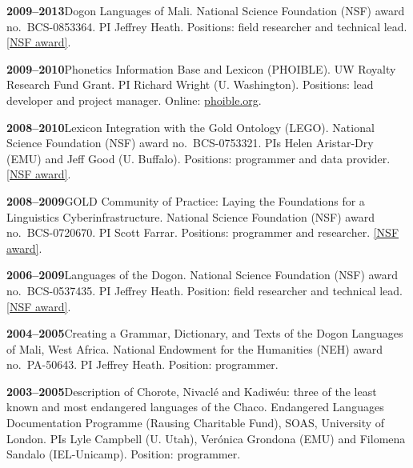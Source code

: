 \documentclass[11pt]{article}
\newcommand{\hangpara}{
 \setlength{\parindent}{0in} %
 \hangindent=0.42in %
}
\begin{document}
\vskip 6pt
\hangpara
{\bf 2009--2013}\hspace{1ex}Dogon Languages of Mali. National Science Foundation (NSF) award no.\ BCS-0853364. PI Jeffrey Heath. Positions: field researcher and technical lead. \href{https://www.nsf.gov/awardsearch/showAward?AWD_ID=0853364}{[NSF award]}.

\vskip 6pt
\hangpara
{\bf 2009--2010}\hspace{1ex}Phonetics Information Base and Lexicon (PHOIBLE). UW Royalty Research Fund Grant. PI Richard Wright (U. Washington). Positions: lead developer and project manager. Online: \href{https://phoible.org/}{phoible.org}.

\vskip 6pt
\hangpara
{\bf 2008--2010}\hspace{1ex}Lexicon Integration with the Gold Ontology (LEGO). National Science Foundation (NSF) award no.\ BCS-0753321. PIs Helen Aristar-Dry (EMU) and Jeff Good (U. Buffalo). Positions: programmer and data provider. \href{https://www.nsf.gov/awardsearch/showAward?AWD_ID=0753321}{[NSF award]}. 

\vskip 6pt
\hangpara
{\bf 2008--2009}\hspace{1ex}GOLD Community of Practice: Laying the Foundations for a Linguistics Cyberinfrastructure. National Science Foundation (NSF) award no.\ BCS-0720670. PI Scott Farrar. Positions: programmer and researcher. \href{https://www.nsf.gov/awardsearch/showAward?AWD_ID=0720670}{[NSF award]}. %

\vskip 6pt
\hangpara
{\bf 2006--2009}\hspace{1ex}Languages of the Dogon. National Science Foundation (NSF) award no.\ BCS-0537435. PI Jeffrey Heath. Position: field researcher and technical lead. \href{https://www.nsf.gov/awardsearch/showAward?AWD_ID=0537435}{[NSF award]}.

\vskip 6pt
\hangpara
{\bf 2004--2005}\hspace{1ex}Creating a Grammar, Dictionary, and Texts of the Dogon Languages of Mali, West Africa. National Endowment for the Humanities (NEH) award no.\ PA-50643. PI Jeffrey Heath. Position: programmer.

\vskip 6pt
\hangpara
{\bf 2003--2005}\hspace{1ex}Description of Chorote, Nivacl{\'e} and Kadiw{\'e}u: three of the least known and most endangered languages of the Chaco. Endangered Languages Documentation Programme (Rausing Charitable Fund), SOAS, University of London. PIs Lyle Campbell (U. Utah), Ver{\'o}nica Grondona (EMU) and Filomena Sandalo (IEL-Unicamp). Position: programmer.
\end{document}
